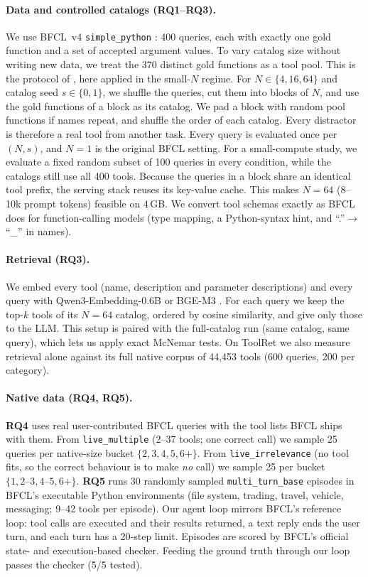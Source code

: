 \paragraph{Data and controlled catalogs (RQ1--RQ3).}
We use BFCL~v4 \texttt{simple\_python} \citep{patil2025bfcl}: 400 queries, each with exactly one gold function and a set of accepted argument values.
To vary catalog size without writing new data, we treat the 370 distinct gold functions as a tool pool. This is the protocol of \citet{kate2025longfunceval}, here applied in the small-$N$ regime.
For $N\in\{4,16,64\}$ and catalog seed $s\in\{0,1\}$, we shuffle the queries, cut them into blocks of $N$, and use the gold functions of a block as its catalog. We pad a block with random pool functions if names repeat, and shuffle the order of each catalog.
Every distractor is therefore a real tool from another task. Every query is evaluated once per $(N,s)$, and $N{=}1$ is the original BFCL setting.
For a small-compute study, we evaluate a fixed random subset of 100 queries in every condition, while the catalogs still use all 400 tools.
Because the queries in a block share an identical tool prefix, the serving stack reuses its key-value cache. This makes $N{=}64$ (8--10k prompt tokens) feasible on 4\,GB.
We convert tool schemas exactly as BFCL does for function-calling models (type mapping, a Python-syntax hint, and ``.''$\to$``\_'' in names).

\paragraph{Retrieval (RQ3).}
We embed every tool (name, description and parameter descriptions) and every query with Qwen3-Embedding-0.6B \citep{zhang2025qwen3embedding} or BGE-M3 \citep{chen2024bgem3}. For each query we keep the top-$k$ tools of its $N{=}64$ catalog, ordered by cosine similarity, and give only those to the LLM.
This setup is paired with the full-catalog run (same catalog, same query), which lets us apply exact McNemar tests.
On ToolRet \citep{shi2025toolret} we also measure retrieval alone against its full native corpus of 44{,}453 tools (600 queries, 200 per category).

\paragraph{Native data (RQ4, RQ5).}
\textbf{RQ4} uses real user-contributed BFCL queries with the tool lists BFCL ships with them.
From \texttt{live\_multiple} (2--37 tools; one correct call) we sample 25 queries per native-size bucket $\{2,3,4,5,6{+}\}$. From \texttt{live\_irrelevance} (no tool fits, so the correct behaviour is to make \emph{no} call) we sample 25 per bucket $\{1,2\text{--}3,4\text{--}5,6{+}\}$.
\textbf{RQ5} runs 30 randomly sampled \texttt{multi\_turn\_base} episodes in BFCL's executable Python environments (file system, trading, travel, vehicle, messaging; 9--42 tools per episode).
Our agent loop mirrors BFCL's reference loop: tool calls are executed and their results returned, a text reply ends the user turn, and each turn has a 20-step limit. Episodes are scored by BFCL's official state- and execution-based checker. Feeding the ground truth through our loop passes the checker (5/5 tested).

